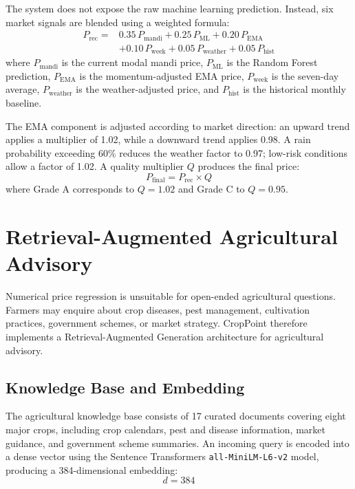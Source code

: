 \documentclass[conference]{IEEEtran}
\begin{document}
The system does not expose the raw machine learning prediction.
Instead, six market signals are blended using a weighted formula:
\begin{equation}
\begin{aligned}
P_{\mathrm{rec}} ={}&
  0.35\,P_{\mathrm{mandi}}
+ 0.25\,P_{\mathrm{ML}}
+ 0.20\,P_{\mathrm{EMA}}\\
&+ 0.10\,P_{\mathrm{week}}
+ 0.05\,P_{\mathrm{weather}}
+ 0.05\,P_{\mathrm{hist}}
\end{aligned}
\label{eq:hybrid}
\end{equation}
where $P_{\mathrm{mandi}}$ is the current modal mandi price,
$P_{\mathrm{ML}}$ is the Random Forest prediction,
$P_{\mathrm{EMA}}$ is the momentum-adjusted EMA price,
$P_{\mathrm{week}}$ is the seven-day average,
$P_{\mathrm{weather}}$ is the weather-adjusted price, and
$P_{\mathrm{hist}}$ is the historical monthly baseline.

The EMA component is adjusted according to market direction: an
upward trend applies a multiplier of 1.02, while a downward trend
applies 0.98. A rain probability exceeding 60\% reduces the weather
factor to 0.97; low-risk conditions allow a factor of 1.02. A
quality multiplier $Q$ produces the final price:
\begin{equation}
    P_{\mathrm{final}} = P_{\mathrm{rec}} \times Q
\end{equation}
where Grade A corresponds to $Q = 1.02$ and Grade C to $Q = 0.95$.

\section{Retrieval-Augmented Agricultural Advisory}

Numerical price regression is unsuitable for open-ended agricultural
questions. Farmers may enquire about crop diseases, pest management,
cultivation practices, government schemes, or market strategy.
CropPoint therefore implements a Retrieval-Augmented Generation
architecture for agricultural advisory.

\subsection{Knowledge Base and Embedding}

The agricultural knowledge base consists of 17 curated documents
covering eight major crops, including crop calendars, pest and
disease information, market guidance, and government scheme
summaries. An incoming query is encoded into a dense vector using
the Sentence Transformers \texttt{all-MiniLM-L6-v2} model, producing
a 384-dimensional embedding:
\begin{equation}
    d = 384
\end{equation}
\end{document}
